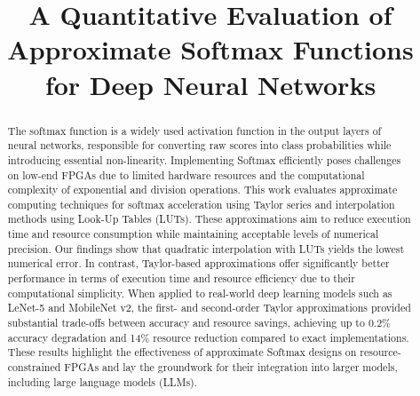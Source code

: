 \documentclass[conference]{IEEEtran}
\begin{document}
\title{A Quantitative Evaluation of Approximate Softmax Functions for Deep Neural Networks}

\author{
  \vspace{3pt}
  \vspace{4pt}
}
\maketitle

\begin{abstract}
The softmax function is a widely used activation function in the output layers of neural networks, responsible for converting raw scores into class probabilities while introducing essential non-linearity. Implementing Softmax efficiently poses challenges on low-end FPGAs due to limited hardware resources and the computational complexity of exponential and division operations.
This work evaluates approximate computing techniques for softmax acceleration using Taylor series and interpolation methods using Look-Up Tables (LUTs). These approximations aim to reduce execution time and resource consumption while maintaining acceptable levels of numerical precision.
Our findings show that quadratic interpolation with LUTs yields the lowest numerical error. In contrast, Taylor-based approximations offer significantly better performance in terms of execution time and resource efficiency due to their computational simplicity. When applied to real-world deep learning models such as LeNet-5 and MobileNet v2, the first- and second-order Taylor approximations provided substantial trade-offs between accuracy and resource savings, achieving up to 0.2\% accuracy degradation and 14\% resource reduction compared to exact implementations. These results highlight the effectiveness of approximate Softmax designs on resource-constrained FPGAs and lay the groundwork for their integration into larger models, including large language models (LLMs).
\end{abstract}
\end{document}
